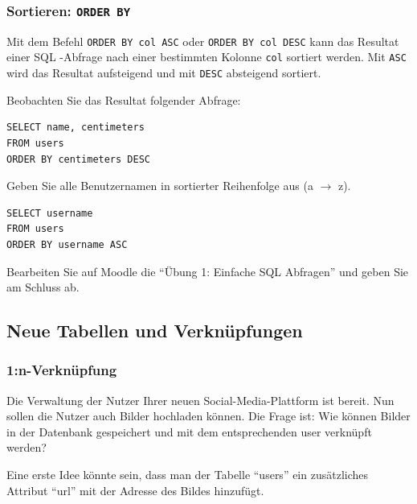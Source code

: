 \subsubsection*{Sortieren: \texorpdfstring{\lstinline|ORDER BY|}{ORDER BY}}

Mit dem Befehl \lstinline|ORDER BY col ASC| oder \lstinline|ORDER BY col DESC| kann das Resultat einer \gls{SQL} -Abfrage nach einer bestimmten Kolonne \lstinline|col| sortiert werden. Mit \lstinline|ASC| wird das Resultat aufsteigend und mit \lstinline|DESC| absteigend sortiert.

\begin{myexample}
Beobachten Sie das Resultat folgender Abfrage:

\begin{lstlisting}
SELECT name, centimeters 
FROM users 
ORDER BY centimeters DESC
\end{lstlisting}
\end{myexample}

\begin{myexercise}
  Geben Sie alle Benutzernamen in sortierter Reihenfolge aus (a $\rightarrow$ z).
  \begin{myanswer}
    \begin{lstlisting}
SELECT username
FROM users
ORDER BY username ASC
\end{lstlisting}
  \end{myanswer}
\end{myexercise}

\begin{myexercise}
  Bearbeiten Sie auf Moodle die \enquote{Übung 1: Einfache SQL Abfragen} und geben Sie am Schluss ab.
\end{myexercise}

\subsection{Neue Tabellen und Verknüpfungen}
\subsubsection{1:n-Verknüpfung}
Die Verwaltung der Nutzer Ihrer neuen Social-Media-Plattform ist bereit. Nun sollen die Nutzer auch Bilder hochladen können. Die Frage ist: Wie können Bilder in der Datenbank gespeichert und mit dem entsprechenden user verknüpft werden?

Eine erste Idee könnte sein, dass man der Tabelle \enquote{users} ein zusätzliches Attribut \enquote{url} mit der Adresse des Bildes hinzufügt.

